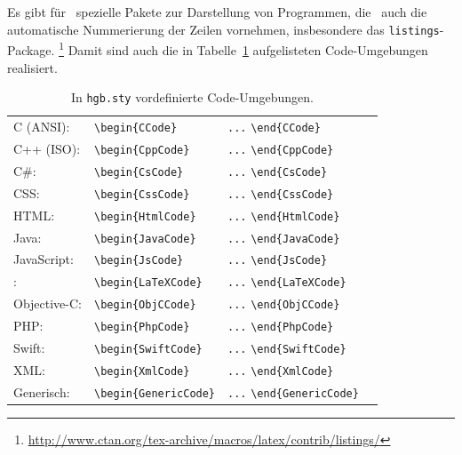 Es gibt für \latex\ spezielle Pakete zur Darstellung von Programmen, die \ua\ auch die automatische Nummerierung der Zeilen vornehmen, insbesondere das \texttt{listings}-Package.%
\footnote{\url{http://www.ctan.org/tex-archive/macros/latex/contrib/listings/}}
Damit sind auch die in Tabelle~\ref{tab:CodeUmgebungen} aufgelisteten Code-Umgebungen 
realisiert.
%
\begin{table}
\caption{In \nolinkurl{hgb.sty} vordefinierte Code-Umgebungen.}
\label{tab:CodeUmgebungen}
\centering
\begin{tabular}{llll}
	\hline
	C (ANSI): & \verb!\begin{CCode}! & \verb!...! \verb!\end{CCode}! \\
	C++ (ISO): & \verb!\begin{CppCode}! & \verb!...! \verb!\end{CppCode}! \\
	C\#: & \verb!\begin{CsCode}! & \verb!...! \verb!\end{CsCode}! \\
	CSS: & \verb!\begin{CssCode}! & \verb!...! \verb!\end{CssCode}! \\
	HTML: & \verb!\begin{HtmlCode}! & \verb!...! \verb!\end{HtmlCode}! \\
	Java: & \verb!\begin{JavaCode}! & \verb!...! \verb!\end{JavaCode}! \\
	JavaScript: & \verb!\begin{JsCode}! & \verb!...! \verb!\end{JsCode}! \\
	\latex: & \verb!\begin{LaTeXCode}! & \verb!...! \verb!\end{LaTeXCode}! \\
	Objective-C: & \verb!\begin{ObjCCode}! & \verb!...! \verb!\end{ObjCCode}! \\
	PHP: & \verb!\begin{PhpCode}! & \verb!...! \verb!\end{PhpCode}! \\
	Swift: & \verb!\begin{SwiftCode}! & \verb!...! \verb!\end{SwiftCode}! \\
	XML: & \verb!\begin{XmlCode}! & \verb!...! \verb!\end{XmlCode}! \\
	Generisch: & \verb!\begin{GenericCode}! & \verb!...! \verb!\end{GenericCode}! \\
	\hline
\end{tabular}
\end{table}
